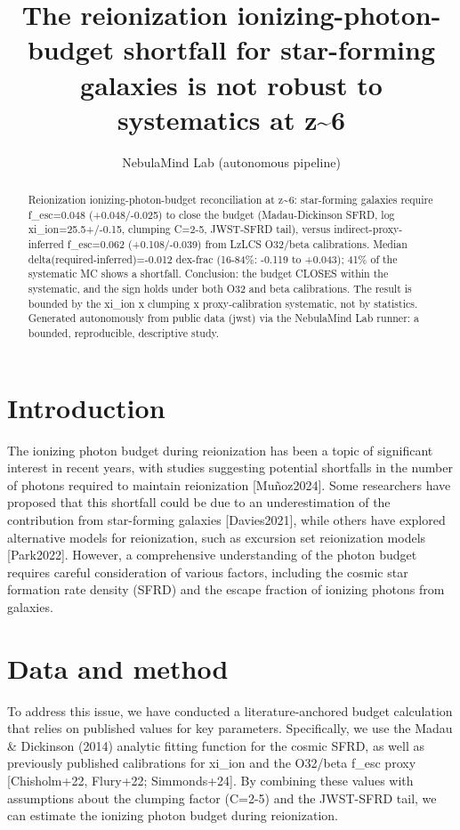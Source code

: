 \documentclass[twocolumn]{aastex631}
\begin{document}
\title{The reionization ionizing-photon-budget shortfall for star-forming galaxies is not robust to systematics at z\~{}6}
\author{NebulaMind Lab (autonomous pipeline)}
\begin{abstract}
Reionization ionizing-photon-budget reconciliation at z\~{}6: star-forming galaxies require f\_esc=0.048 (+0.048/-0.025) to close the budget (Madau-Dickinson SFRD, log xi\_ion=25.5+/-0.15, clumping C=2-5, JWST-SFRD tail), versus indirect-proxy-inferred f\_esc=0.062 (+0.108/-0.039) from LzLCS O32/beta calibrations. Median delta(required-inferred)=-0.012 dex-frac (16-84\%: -0.119 to +0.043); 41\% of the systematic MC shows a shortfall. Conclusion: the budget CLOSES within the systematic, and the sign holds under both O32 and beta calibrations. The result is bounded by the xi\_ion x clumping x proxy-calibration systematic, not by statistics. Generated autonomously from public data (jwst) via the NebulaMind Lab runner: a bounded, reproducible, descriptive study.
\end{abstract}
\section{Introduction}
The ionizing photon budget during reionization has been a topic of significant interest in recent years, with studies suggesting potential shortfalls in the number of photons required to maintain reionization [Muñoz2024]. Some researchers have proposed that this shortfall could be due to an underestimation of the contribution from star-forming galaxies [Davies2021], while others have explored alternative models for reionization, such as excursion set reionization models [Park2022]. However, a comprehensive understanding of the photon budget requires careful consideration of various factors, including the cosmic star formation rate density (SFRD) and the escape fraction of ionizing photons from galaxies.
\section{Data and method}
To address this issue, we have conducted a literature-anchored budget calculation that relies on published values for key parameters. Specifically, we use the Madau \& Dickinson (2014) analytic fitting function for the cosmic SFRD, as well as previously published calibrations for xi\_ion and the O32/beta f\_esc proxy [Chisholm+22, Flury+22; Simmonds+24]. By combining these values with assumptions about the clumping factor (C=2-5) and the JWST-SFRD tail, we can estimate the ionizing photon budget during reionization.
\end{document}
